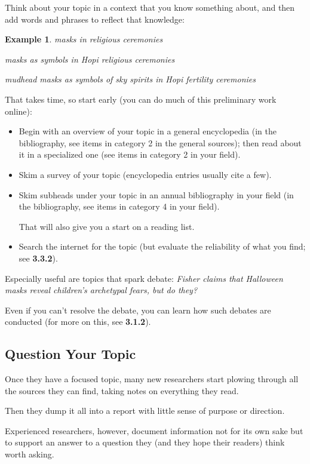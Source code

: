 \documentclass[oneside]{book}
\numberwithin{equation}{section}
\newtheorem{example}{Example}[section]
\begin{document}
Think about your topic in a context that you know something about, and then add words and phrases to reflect that knowledge:
\begin{example}
    masks in religious ceremonies
    
    masks as symbols in Hopi religious ceremonies
    
    mudhead masks as symbols of sky spirits in Hopi fertility ceremonies
\end{example}

That takes time, so start early (you can do much of this preliminary work online):
\begin{itemize}
    \item Begin with an overview of your topic in a general encyclopedia (in the bibliography, see items in category 2 in the general sources); then read about it in a specialized one (see items in category 2 in your field).
    \item Skim a survey of your topic (encyclopedia entries usually cite a few).
    \item Skim subheads under your topic in an annual bibliography in your field (in the bibliography, see items in category 4 in your field).
    
    That will also give you a start on a reading list.
    \item Search the internet for the topic (but evaluate the reliability of what you find; see \textbf{3.3.2}).
\end{itemize}
Especially useful are topics that spark debate: \textit{Fisher claims that Halloween masks reveal children's archetypal fears, but do they?}

Even if you can't resolve the debate, you can learn how such debates are conducted (for more on this, see \textbf{3.1.2}).

\subsection{Question Your Topic}
Once they have a focused topic, many new researchers start plowing through all the sources they can find, taking notes on everything they read.

Then they dump it all into a report with little sense of purpose or direction.

Experienced researchers, however, document information not for its own sake but to support an answer to a question they (and they hope their readers) think worth asking.
\end{document}
